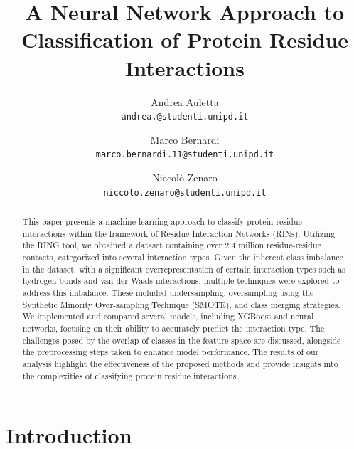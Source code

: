 \documentclass[10pt,twocolumn,letterpaper]{article}
\begin{document}
\title{A Neural Network Approach to Classification of Protein Residue Interactions}

\author{Andrea Auletta\\
{\tt\small andrea.@studenti.unipd.it}
\and
Marco Bernardi\\
{\tt\small marco.bernardi.11@studenti.unipd.it}
\and
Niccolò Zenaro\\
{\tt\small niccolo.zenaro@studenti.unipd.it}
}

\maketitle

\begin{abstract}
    This paper presents a machine learning approach to classify protein residue interactions within the framework of Residue Interaction Networks (RINs). 
    Utilizing the RING tool, we obtained a dataset containing over 2.4 million residue-residue contacts, categorized into several interaction types. Given the inherent class imbalance in the dataset, with a significant overrepresentation of certain interaction types such as hydrogen bonds and van der Waals interactions, multiple techniques were explored to address this imbalance. 
    These included undersampling, oversampling using the Synthetic Minority Over-sampling Technique (SMOTE), and class merging strategies. We implemented and compared several models, including XGBoost and neural networks, focusing on their ability to accurately predict the interaction type. 
    The challenges posed by the overlap of classes in the feature space are discussed, alongside the preprocessing steps taken to enhance model performance. 
    The results of our analysis highlight the effectiveness of the proposed methods and provide insights into the complexities of classifying protein residue interactions.
\end{abstract}
    

\section{Introduction}
\end{document}
